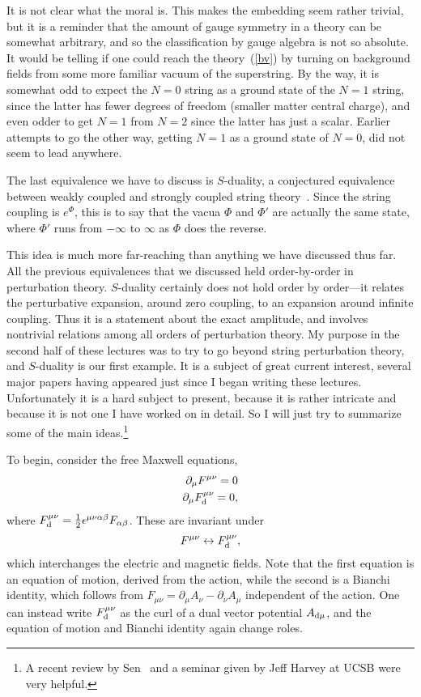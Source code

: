 It is not clear what the moral is.  This makes the embedding seem
rather trivial, but it is a reminder that the amount of gauge
symmetry in a theory can be somewhat arbitrary, and so the 
classification by gauge algebra
is not so absolute.  It would be telling if
one could reach the theory~(\ref{bv}) by turning on background
fields from some more familiar vacuum of the superstring.  By the
way, it is somewhat odd to expect the $N=0$ string as a ground state
of the
$N=1$ string, since the latter has fewer degrees of freedom (smaller
matter central charge), and even odder to get $N=1$ from $N=2$ since
the latter has just a scalar.  Earlier attempts to go the other way,
getting $N=1$ as a ground state of $N=0$, did not seem to lead
anywhere.


The last equivalence we have to discuss is $S$-duality, a conjectured
equivalence between weakly coupled and strongly coupled string
theory~\cite{FILQ}. Since the string coupling is $e^{\Phi}$, this is
to say that the vacua $\Phi$ and $\Phi'$ are actually the same
state, where $\Phi'$ runs from $-\infty$ to $\infty$ as $\Phi$ does
the reverse.

This idea is much more far-reaching than anything we have
discussed thus far.  All the previous equivalences that we discussed
held order-by-order in perturbation theory.  $S$-duality
certainly does not hold order by order---it relates the perturbative
expansion, around zero coupling, to an expansion around infinite
coupling.
Thus it is a statement about the exact amplitude, and involves
nontrivial relations among all orders of perturbation theory.  My
purpose in the second half of these lectures was to try to go beyond
string perturbation theory, and $S$-duality is our first example.  It
is a subject of great current interest, several major papers having
appeared just since I began writing these lectures.  Unfortunately it
is a hard subject to present, because it is rather intricate and
because it is not one I have worked on in detail.  So I will just try
to summarize some of the main ideas.\footnote{A recent review by
Sen~\cite{Senrev} and a seminar given by Jeff Harvey at UCSB were
very helpful.}

To begin, consider the free Maxwell equations,
\begin{eqnarray}
\partial_\mu F^{\mu\nu} = 0 \nonumber\\
\partial_\mu F_{\rm d}^{\mu\nu} = 0,
\end{eqnarray}
where $F_{\rm d}^{\mu\nu} = \frac{1}{2}\epsilon^{\mu\nu\alpha\beta}
F_{\alpha\beta}$.  These are invariant under
\begin{equation}
F^{\mu\nu} \leftrightarrow F_{\rm d}^{\mu\nu}, \label{abdu}
\end{equation}
which interchanges the
electric and magnetic fields.  Note that the first equation is an
equation of motion, derived from the action, while the second is a
Bianchi identity, which follows from $F_{\mu\nu} = \partial_\mu A_\nu
- \partial_\nu A_\mu$ independent of the action.
One can instead write
$F_{\rm d}^{\mu\nu}$ as the curl of a dual vector potential
$A_{{\rm d} \mu}$, and
the equation of motion and Bianchi identity again change roles.

